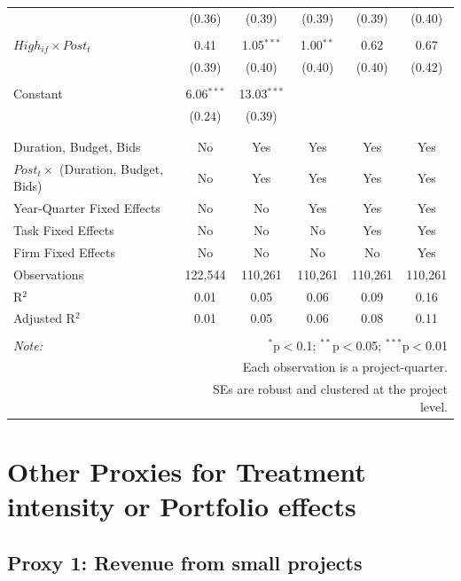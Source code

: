 \documentclass[
]{article}
\begin{document}
\begin{table}[H]
\begin{tabular}{@{\extracolsep{-2pt}}lccccc}
  & (0.36) & (0.39) & (0.39) & (0.39) & (0.40) \\ 
  & & & & & \\ 
 $High_{if} \times Post_t$ & 0.41 & 1.05$^{***}$ & 1.00$^{**}$ & 0.62 & 0.67 \\ 
  & (0.39) & (0.40) & (0.40) & (0.40) & (0.42) \\ 
  & & & & & \\ 
 Constant & 6.06$^{***}$ & 13.03$^{***}$ &  &  &  \\ 
  & (0.24) & (0.39) &  &  &  \\ 
  & & & & & \\ 
\hline \\[-1.8ex] 
Duration, Budget, Bids & No & Yes & Yes & Yes & Yes \\ 
$Post_t \times$  (Duration, Budget, Bids) & No & Yes & Yes & Yes & Yes \\ 
Year-Quarter Fixed Effects & No & No & Yes & Yes & Yes \\ 
Task Fixed Effects & No & No & No & Yes & Yes \\ 
Firm Fixed Effects & No & No & No & No & Yes \\ 
Observations & 122,544 & 110,261 & 110,261 & 110,261 & 110,261 \\ 
R$^{2}$ & 0.01 & 0.05 & 0.06 & 0.09 & 0.16 \\ 
Adjusted R$^{2}$ & 0.01 & 0.05 & 0.06 & 0.08 & 0.11 \\ 
\hline 
\hline \\[-1.8ex] 
\textit{Note:}  & \multicolumn{5}{r}{$^{*}$p$<$0.1; $^{**}$p$<$0.05; $^{***}$p$<$0.01} \\ 
 & \multicolumn{5}{r}{Each observation is a project-quarter.} \\ 
 & \multicolumn{5}{r}{SEs are robust and clustered at the project level.} \\ 
\end{tabular} 
\end{table}

\hypertarget{other-proxies-for-treatment-intensity-or-portfolio-effects}{%
\section{Other Proxies for Treatment intensity or Portfolio
effects}\label{other-proxies-for-treatment-intensity-or-portfolio-effects}}

\hypertarget{proxy-1-revenue-from-small-projects}{%
\subsection{Proxy 1: Revenue from small
projects}\label{proxy-1-revenue-from-small-projects}}
\end{document}
